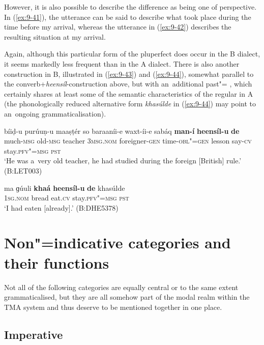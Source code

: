 However, it is also possible to describe the difference as being one of perspective. In (\ref{ex:9-41}), the utterance can be said to describe what took place during the time before my arrival, whereas the utterance in (\ref{ex:9-42}) describes the resulting situation at my arrival.


Again, although this particular form of the pluperfect does occur in the B dialect, it seems markedly less frequent than in the A dialect. There is also another construction in B, illustrated in (\ref{ex:9-43}) and (\ref{ex:9-44}), somewhat parallel to the converb+\textit{heensíl}-construction above, but with an~additional past"= , which certainly shares at least some of the semantic characteristics of the regular  in A (the phonologically reduced alternative form \textit{khasúlde} in (\ref{ex:9-44}) may point to an~ongoing grammaticalisation).

\ea
\label{ex:9-43}
\gll bíiḍ-u purúuṇ-u maaṣṭér so baraaníi-e waxt-íi-e sabáq \textbf{man-í} \textbf{heensíl-u} \textbf{de} \\
much-\textsc{msg} old-\textsc{msg} teacher 3\textsc{msg.nom}  foreigner-\textsc{gen}
time-\textsc{obl"=gen} lesson say-\textsc{cv} stay.\textsc{pfv"=msg} \textsc{pst} \\
\glt `He was a~very old teacher, he had studied during the foreign [British] rule.' (B:LET003)

\ex
\label{ex:9-44}
\gll ma ɡúuli \textbf{khaá} \textbf{heensíl-u} \textbf{de} \upshape{(=} khasúlde\upshape{)}\\
\textsc{1sg.nom} bread eat.\textsc{cv} stay.\textsc{pfv"=msg} \textsc{pst}\\
\glt `I had eaten [already].' (B:DHE5378)
\z

\section{Non"=indicative  categories and their functions}
\label{sec:9-2}


Not all of the following categories are equally central or to the same extent grammaticalised, but they are all somehow part of the modal realm within the TMA system and thus deserve to be mentioned together in one place.


\subsection{Imperative}
\label{subsec:9-2-1}

